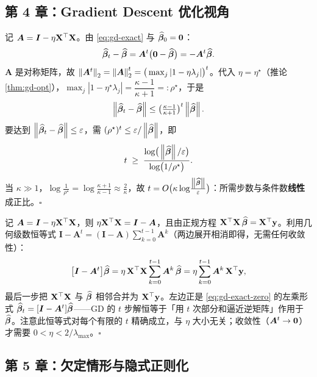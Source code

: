 \subsection{第 4 章：Gradient Descent 优化视角}

\begin{description}[style=nextline, itemsep=1.2ex]
\item[练习 \ref{ex:gd-rate}（最优步长下的收敛界）]
记 $\bm{A} = \bm{I} - \eta\mathbf{X}^\top\mathbf{X}$。由 \eqref{eq:gd-exact} 与 $\widehat{\bm{\beta}}_0 = \mathbf{0}$：
\[
  \widehat{\bm{\beta}}_t - \widehat{\bm{\beta}} = \bm{A}^t\big(\mathbf{0} - \widehat{\bm{\beta}}\big) = -\bm{A}^t \widehat{\bm{\beta}} .
\]
$\bm{A}$ 是对称矩阵，故 $\left\lVert \bm{A}^t \right\rVert_2 = \left\lVert \bm{A} \right\rVert_2^t = \big(\max_j |1 - \eta\lambda_j|\big)^t$。代入 $\eta = \eta^\star$（推论 \ref{thm:gd-opt}），$\max_j|1 - \eta^\star\lambda_j| = \dfrac{\kappa - 1}{\kappa + 1} =: \rho^\star$，于是
\[
  \left\lVert \widehat{\bm{\beta}}_t - \widehat{\bm{\beta}} \right\rVert \le \big(\tfrac{\kappa-1}{\kappa+1}\big)^t \left\lVert \widehat{\bm{\beta}} \right\rVert.
\]
要达到 $\left\lVert \widehat{\bm{\beta}}_t - \widehat{\bm{\beta}} \right\rVert \le \varepsilon$，需 $(\rho^\star)^t \le \varepsilon / \left\lVert \widehat{\bm{\beta}} \right\rVert$，即
\[
  t \;\ge\; \frac{\log\!\big(\left\lVert \widehat{\bm{\beta}} \right\rVert/\varepsilon\big)}{\log\!\big(1/\rho^\star\big)} .
\]
当 $\kappa \gg 1$，$\log\frac{1}{\rho^\star} = \log\frac{\kappa+1}{\kappa-1} \approx \frac{2}{\kappa}$，故 $t = O\big(\kappa \log\!\frac{\left\lVert \widehat{\bm{\beta}} \right\rVert}{\varepsilon}\big)$：所需步数与条件数\textbf{线性}成正比。$\square$

\item[练习 \ref{ex:neumann}（Neumann 恒等式）]
记 $\bm{A} = \bm{I} - \eta\mathbf{X}^\top\mathbf{X}$，则 $\eta\mathbf{X}^\top\mathbf{X} = \bm{I} - \bm{A}$，且由正规方程 $\mathbf{X}^\top\mathbf{X}\,\widehat{\bm{\beta}} = \mathbf{X}^\top\mathbf{y}$。利用几何级数恒等式 $\bm{I} - \bm{A}^t = (\bm{I}-\bm{A})\sum_{k=0}^{t-1}\bm{A}^k$（两边展开相消即得，无需任何收敛性）：
\[
  \big[\bm{I} - \bm{A}^t\big]\widehat{\bm{\beta}}
  = \eta\,\mathbf{X}^\top\mathbf{X} \sum_{k=0}^{t-1}\bm{A}^k\,\widehat{\bm{\beta}}
  = \eta \sum_{k=0}^{t-1}\bm{A}^k\,\mathbf{X}^\top\mathbf{y} ,
\]
最后一步把 $\mathbf{X}^\top\mathbf{X}$ 与 $\widehat{\bm{\beta}}$ 相邻合并为 $\mathbf{X}^\top\mathbf{y}$。左边正是 \eqref{eq:gd-exact-zero} 的左乘形式 $\widehat{\bm{\beta}}_t = [\bm{I} - \bm{A}^t]\widehat{\bm{\beta}}$——GD 的 $t$ 步解恒等于「用 $t$ 次部分和逼近逆矩阵」作用于 $\widehat{\bm{\beta}}$。注意此恒等式对每个有限的 $t$ 精确成立，与 $\eta$ 大小无关；收敛性（$\bm{A}^t \to \mathbf{0}$）才需要 $0 < \eta < 2/\lambda_{\max}$。$\square$
\end{description}

\subsection{第 5 章：欠定情形与隐式正则化}

